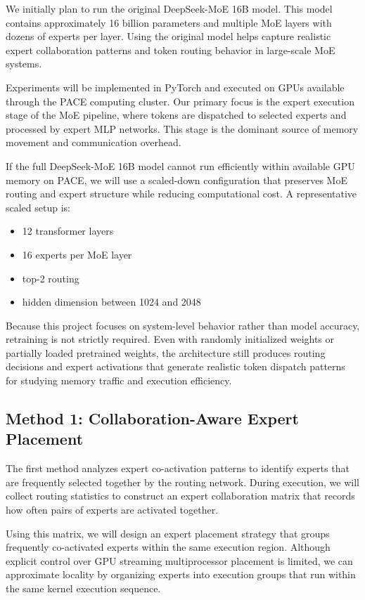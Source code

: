\documentclass{article} %
\begin{document}
We initially plan to run the original DeepSeek-MoE 16B model. This model contains approximately 16 billion parameters and multiple MoE layers with dozens of experts per layer. Using the original model helps capture realistic expert collaboration patterns and token routing behavior in large-scale MoE systems.

Experiments will be implemented in PyTorch and executed on GPUs available through the PACE computing cluster. Our primary focus is the expert execution stage of the MoE pipeline, where tokens are dispatched to selected experts and processed by expert MLP networks. This stage is the dominant source of memory movement and communication overhead.

If the full DeepSeek-MoE 16B model cannot run efficiently within available GPU memory on PACE, we will use a scaled-down configuration that preserves MoE routing and expert structure while reducing computational cost. A representative scaled setup is:
\begin{itemize}
\item 12 transformer layers
\item 16 experts per MoE layer
\item top-2 routing
\item hidden dimension between 1024 and 2048
\end{itemize}

Because this project focuses on system-level behavior rather than model accuracy, retraining is not strictly required. Even with randomly initialized weights or partially loaded pretrained weights, the architecture still produces routing decisions and expert activations that generate realistic token dispatch patterns for studying memory traffic and execution efficiency.

\subsection{Method 1: Collaboration-Aware Expert Placement}
The first method analyzes expert co-activation patterns to identify experts that are frequently selected together by the routing network. During execution, we will collect routing statistics to construct an expert collaboration matrix that records how often pairs of experts are activated together.

Using this matrix, we will design an expert placement strategy that groups frequently co-activated experts within the same execution region. Although explicit control over GPU streaming multiprocessor placement is limited, we can approximate locality by organizing experts into execution groups that run within the same kernel execution sequence.
\end{document}
